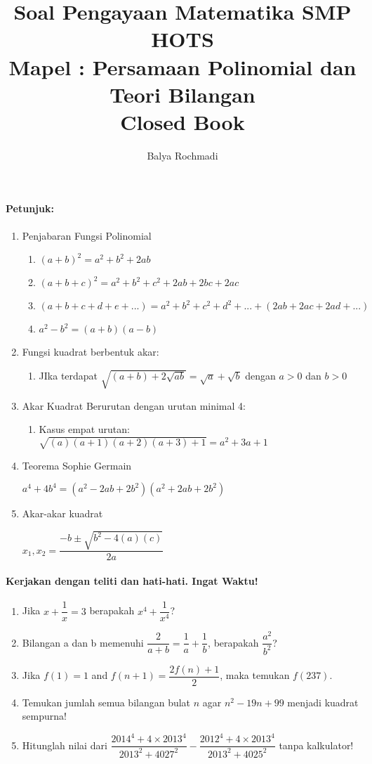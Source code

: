 \documentclass[12pt,a4paper,draft,final,oneside,twoside,openright,openany]{article}
\author{Balya Rochmadi}
\title{Soal Pengayaan Matematika SMP HOTS \\Mapel : Persamaan Polinomial dan Teori Bilangan \\Closed Book}
\begin{document}
	\maketitle
	\Large
		\noindent\makebox[\linewidth]{\rule{\paperwidth}{0.4pt}}
	\paragraph{Petunjuk:}
	\begin{enumerate}
		\item Penjabaran Fungsi Polinomial
			\begin{enumerate}
				\item $(a+b)^2=a^2+b^2+2ab$
				\item $(a+b+c)^2=a^2+b^2+c^2+2ab+2bc+2ac$
				\item $(a+b+c+d+e+...)=a^2+b^2+c^2+d^2+...+(2ab+2ac+2ad+...)$
				\item $a^2-b^2=(a+b)(a-b)$
			\end{enumerate}	
		\item Fungsi kuadrat berbentuk akar:
			\begin{enumerate}
				\item JIka terdapat $\sqrt{(a+b)+2\sqrt{ab}}=\sqrt{a}+\sqrt{b}$ dengan $a>0$ dan $b>0$
			\end{enumerate}
		\item Akar Kuadrat Berurutan dengan urutan minimal 4:
			\begin{enumerate}
				\item Kasus empat urutan:
				$\sqrt{(a)(a+1)(a+2)(a+3)+1}=a^2+3a+1$
			\end{enumerate}
		\item Teorema Sophie Germain 
		\begin{center}
			$a^4+4b^4=(a^2-2ab+2b^2)(a^2+2ab+2b^2)$
		\end{center}
		\item Akar-akar kuadrat
		\begin{center}
			$x_1,x_2=\dfrac{-b \pm \sqrt{b^2-4(a)(c)}}{2a}$
		\end{center}
		
	\end{enumerate}
		\noindent\makebox[\linewidth]{\rule{\paperwidth}{0.4pt}}
	\paragraph{Kerjakan dengan teliti dan hati-hati. Ingat Waktu!}
	\begin{enumerate}
		\item Jika $x+\dfrac{1}{x} = 3$ berapakah $x^4+\dfrac{1}{x^4}$?
		\item Bilangan a dan b memenuhi $\dfrac{2}{a+b}=\dfrac{1}{a}+\dfrac{1}{b}$, berapakah $\dfrac{a^2}{b^2}$?
		\item Jika $f(1) = 1$ and $f(n+1) = \dfrac{2f(n) + 1}{2}$, maka temukan $f(237)$.
		\item Temukan jumlah semua bilangan bulat $n$ agar $n^2-19n+99$ menjadi kuadrat sempurna!
		\item Hitunglah nilai dari $\dfrac{2014^4+4\times 2013^4}{2013^2+4027^2}-\dfrac{2012^4+4\times 2013^4}{2013^2+4025^2}$ tanpa kalkulator!
	\end{enumerate}
	
	
	
	
\end{document}
